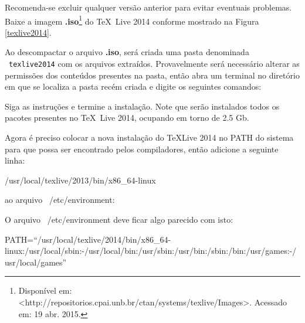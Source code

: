 Recomenda-se excluir qualquer versão anterior para evitar eventuais problemas. Baixe a imagem \textbf{.iso}\footnote{Disponível em: <http://repositorios.cpai.unb.br/ctan/systems/texlive/Images>. Acessado em: 19 abr. 2015.} do \TeX\ Live 2014 conforme mostrado na Figura \ref{texlive2014}.

Ao descompactar o arquivo \textbf{.iso}, será criada uma pasta denominada \mbox{\drawtikzfolder\  \texttt{texlive2014}} com os arquivos extraídos. Provavelmente será necessário alterar as permissões dos conteúdos presentes na pasta, então abra um terminal no diretório em que se localiza a pasta recém criada e digite os seguintes comandos:\vspace{10pt}

\noindent
{}

\vspace*{5pt}
\noindent
Siga as instruções e termine a instalação. Note que serão instalados todos os pacotes presentes no \TeX\ Live 2014, ocupando em torno de 2.5 Gb.

Agora é preciso colocar a nova instalação do \TeX Live 2014 no PATH do sistema para que possa ser encontrado pelos compiladores, então adicione a seguinte linha:

\begin{center}
{\ttfamily /usr/local/texlive/2013/bin/x86\_64-linux} 
\end{center}

\noindent
ao arquivo \drawtikzfolder\ {\ttfamily /etc/environment}:
\vspace*{10pt}

\noindent
{}

\vspace*{5pt}
\noindent
O arquivo \drawtikzfolder\ {\ttfamily /etc/environment} deve ficar algo parecido com isto:

\vspace*{10pt}
\begin{center}
PATH=``/usr/local/texlive/2014/bin/x86\_64-linux:/usr/local/sbin:-/usr/local/bin:/usr/sbin:/usr/bin:/sbin:/bin:/usr/games:-/usr/local/games''
\end{center}

